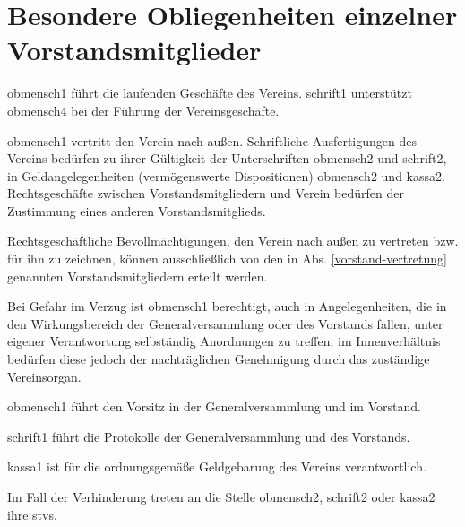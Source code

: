 \documentclass{article}
\begin{document}
\section{Besondere Obliegenheiten einzelner Vorstandsmitglieder}\label{vorstand-besonders}
\begin{absatz}
    \item \Gls{obmensch1} führt die laufenden Geschäfte des Vereins. \Gls{schrift1} unterstützt \gls{obmensch4} bei der Führung der Vereinsgeschäfte.
    \item \label{vorstand-vertretung} \Gls{obmensch1} vertritt den Verein nach außen. Schriftliche Ausfertigungen des Vereins bedürfen zu ihrer Gültigkeit der Unterschriften \gls{obmensch2} und \gls{schrift2}, in Geldangelegenheiten (vermögenswerte Dispositionen) \gls{obmensch2} und \gls{kassa2}. Rechtsgeschäfte zwischen Vorstandsmitgliedern und Verein bedürfen der Zustimmung eines anderen Vorstandsmitglieds.
    \item Rechtsgeschäftliche Bevollmächtigungen, den Verein nach außen zu vertreten bzw. für ihn zu zeichnen, können ausschließlich von den in Abs. \ref{vorstand-vertretung} genannten Vorstandsmitgliedern erteilt werden.
    \item Bei Gefahr im Verzug ist \gls{obmensch1} berechtigt, auch in Angelegenheiten, die in den Wirkungsbereich der Generalversammlung oder des Vorstands fallen, unter eigener Verantwortung selbständig Anordnungen zu treffen; im Innenverhältnis bedürfen diese jedoch der nachträglichen Genehmigung durch das zuständige Vereinsorgan.
    \item \Gls{obmensch1} führt den Vorsitz in der Generalversammlung und im Vorstand.
    \item \Gls{schrift1} führt die Protokolle der Generalversammlung und des Vorstands.
    \item \Gls{kassa1} ist für die ordnungsgemäße Geldgebarung des Vereins verantwortlich.
    \item Im Fall der Verhinderung treten an die Stelle \gls{obmensch2}, \gls{schrift2} oder \gls{kassa2} ihre \glspl{stv}.
\end{absatz}
\end{document}
